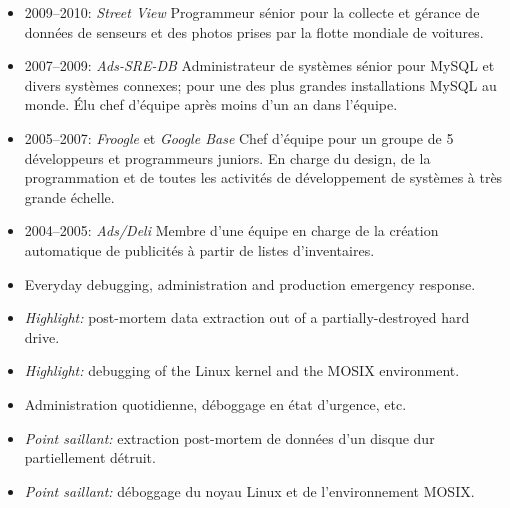 \begin{langfr}
\begin{itemize}%
\vspace{2 mm}
\item 2009--2010: \textit{Street View} Programmeur s\'{e}nior pour la collecte et g\'{e}rance de donn\'{e}es de senseurs et des photos prises par la flotte mondiale de voitures.
\item 2007--2009: \textit{Ads-SRE-DB} Administrateur de syst\`{e}mes s\'{e}nior pour MySQL et divers syst\`{e}mes connexes; pour une des plus grandes installations MySQL au monde. \'{E}lu chef d'\'{e}quipe apr\`{e}s moins d'un an dans l'\'{e}quipe.
\item 2005--2007: \textit{Froogle} et \textit{Google Base} Chef d'\'{e}quipe pour un groupe de 5 d\'{e}veloppeurs et programmeurs juniors. En charge du design, de la programmation et de toutes les activit\'{e}s de d\'{e}veloppement de syst\`{e}mes \`{a} tr\`{e}s grande \'{e}chelle.
\item 2004--2005: \textit{Ads/Deli} Membre d'une \'{e}quipe en charge de la cr\'{e}ation automatique de publicit\'{e}s \`{a} partir de listes d'inventaires.
\end{itemize}
\end{langfr}

\pagebreak

\begin{langen}
\begin{itemize}%
\item Everyday debugging, administration and production emergency response.
\item \textit{Highlight:} post-mortem data extraction out of a partially-destroyed hard drive.
\item \textit{Highlight:} debugging of the Linux kernel and the MOSIX environment.
\end{itemize}
\end{langen}
\begin{langfr}
\begin{itemize}%
\item Administration quotidienne, d\'{e}boggage en \'{e}tat d'urgence, etc.
\item \textit{Point saillant:} extraction post-mortem de donn\'{e}es d'un disque dur partiellement d\'{e}truit.
\item \textit{Point saillant:} d\'{e}boggage du noyau Linux et de l'environnement MOSIX.
\end{itemize}
\end{langfr}

